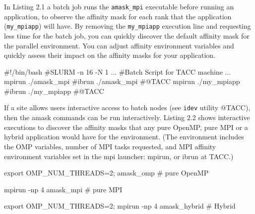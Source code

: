 \documentclass[10pt,a4paper]{report}
\begin{document}
In Listing 2.1
a batch job runs the \verb+amask_mpi+ executable before running an application, to observe
the affinity mask for each rank that the application (\verb+my_mpiapp+) will have.
By removing the \verb+my_mpiapp+ execution line and requesting less time for the batch job, you
can quickly discover the default affinity mask for the parallel environment. 
You can adjust affinity environment variables and quickly assess their impact on 
the affinity masks for your application.  

\begin{code}[frame=single,breaklines=true,numbers=left,language=C,caption=Listing affinity masks for MPI environment \label{batchamask}]

     #!/bin/bash
     #SLURM  -n 16 -N 1
         ...
     #Batch Script for TACC machine
        ...
      mpirun ./amask_mpi    #ibrun ./amask_mpi #@TACC
      mpirun ./my_mpiapp    #ibrun ./my_mpiapp #@TACC

\end{code}

If a site allows users interactive access to batch nodes (see \verb+idev+ utility @TACC), then
the amask commands can be run interactively. 
Listing 2.2
shows interactive executions to discover the affinity masks
that any pure OpenMP, pure MPI or a hybrid application would have for the environment.
(The environment includes the OMP variables, number of MPI tasks requested, and
MPI affinity environment variables set in the mpi launcher: mpirun, or ibrun at TACC.)

\begin{code}[frame=single,breaklines=true,numbers=left,language=C,caption=Listing OpenMP/MPI and Hybrid masks\label{interactiveamask}]

     export OMP_NUM_THREADS=2; amask_omp   # pure OpenMP
 
     mpirun -np 4 amask_mpi                # pure MPI
 
     export OMP_NUM_THREADS=2; mpirun -np 4 amask_hybrid   # Hybrid

\end{code}
 
\end{document}

